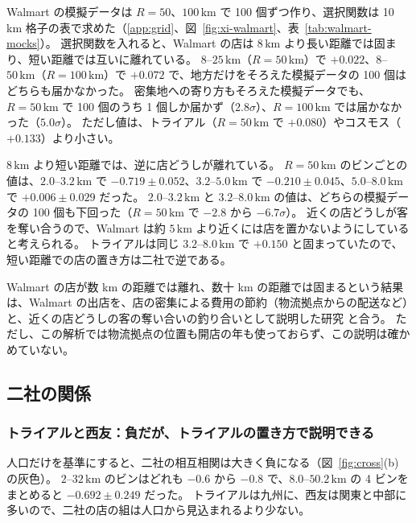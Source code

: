 \documentclass[a4paper,11pt]{ltjsarticle}
\begin{document}
Walmart の模擬データは $R = 50$、$100\,\mathrm{km}$ で 100 個ずつ作り、選択関数は 10 km 格子の表で求めた（\ref{app:grid}、図~\ref{fig:xi-walmart}、表~\ref{tab:walmart-mocks}）。
選択関数を入れると、Walmart の店は $8\,\mathrm{km}$ より長い距離では固まり、短い距離では互いに離れている。
$8$--$25\,\mathrm{km}$（$R = 50\,\mathrm{km}$）で $+0.022$、$8$--$50\,\mathrm{km}$（$R = 100\,\mathrm{km}$）で $+0.072$ で、地方だけをそろえた模擬データの 100 個はどちらも届かなかった。
密集地への寄り方もそろえた模擬データでも、$R = 50\,\mathrm{km}$ で 100 個のうち 1 個しか届かず（$2.8\sigma$）、$R = 100\,\mathrm{km}$ では届かなかった（$5.0\sigma$）。
ただし値は、トライアル（$R = 50\,\mathrm{km}$ で $+0.080$）やコスモス（$+0.133$）より小さい。

$8\,\mathrm{km}$ より短い距離では、逆に店どうしが離れている。
$R = 50\,\mathrm{km}$ のビンごとの値は、$2.0$--$3.2\,\mathrm{km}$ で $-0.719 \pm 0.052$、$3.2$--$5.0\,\mathrm{km}$ で $-0.210 \pm 0.045$、$5.0$--$8.0\,\mathrm{km}$ で $+0.006 \pm 0.029$ だった。
$2.0$--$3.2\,\mathrm{km}$ と $3.2$--$8.0\,\mathrm{km}$ の値は、どちらの模擬データの 100 個も下回った（$R = 50\,\mathrm{km}$ で $-2.8$ から $-6.7\sigma$）。
近くの店どうしが客を奪い合うので、Walmart は約 $5\,\mathrm{km}$ より近くには店を置かないようにしていると考えられる。
トライアルは同じ $3.2$--$8.0\,\mathrm{km}$ で $+0.150$ と固まっていたので、短い距離での店の置き方は二社で逆である。

Walmart の店が数 km の距離では離れ、数十 km の距離では固まるという結果は、Walmart の出店を、店の密集による費用の節約（物流拠点からの配送など）と、近くの店どうしの客の奪い合いの釣り合いとして説明した研究 \cite{Holmes2011} と合う。
ただし、この解析では物流拠点の位置も開店の年も使っておらず、この説明は確かめていない。

\subsection{二社の関係}
\label{sec:res-cross}

\subsubsection{トライアルと西友：負だが、トライアルの置き方で説明できる}

人口だけを基準にすると、二社の相互相関は大きく負になる（図~\ref{fig:cross}(b) の灰色）。
$2$--$32\,\mathrm{km}$ のビンはどれも $-0.6$ から $-0.8$ で、$8.0$--$50.2\,\mathrm{km}$ の 4 ビンをまとめると $-0.692 \pm 0.249$ だった。
トライアルは九州に、西友は関東と中部に多いので、二社の店の組は人口から見込まれるより少ない。
\end{document}
